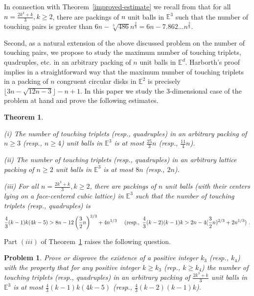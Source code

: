 \documentclass[10pt]{article}
\newtheorem{Theorem}{Theorem}
\newtheorem{Problem}{Problem}
\numberwithin{Subcase}{Case}
\begin{document}
In connection with Theorem~\ref{improved-estimate} we recall from \cite{B12} that for all $n=\frac{2k^{3} +k}{3}, k \geq 2$, there are packings of $n$ unit balls in $\mathbb{E}^3$ such that the number of touching pairs is greater than $6n-\sqrt[3]{486}n^{\frac{2}{3}}=6n-7.862\dots n^{\frac{2}{3}}$.

Second,  as a natural extension of the above discussed problem on the number of touching pairs, we propose to study the maximum number of touching triplets, quadruples, etc. in an arbitrary packing of $n$ unit balls in $\mathbb{E}^{d}$. Harborth's proof \cite{Ha} implies in a straightforward way that the maximum number of touching triplets in a packing of $n$ congruent circular disks in $\mathbb{E}^{2}$ is precisely $\lfloor 3n-\sqrt{12n-3}\rfloor-n+1$. In this paper we study the $3$-dimensional case of the problem at hand and prove the following estimates.


\begin{Theorem}\label{main-theorem}
\item (i)
The number of touching triplets (resp., quadruples) in an arbitrary packing of $n\ge 3$ (resp., $n\ge 4$) unit balls in $\mathbb{E}^3$ is at most $\frac{25}{3}n$ (resp., $\frac{11}{4}n$).
\item(ii)
The number of touching  triplets (resp., quadruples) in an arbitrary lattice packing of $n\ge 2$ unit balls in $\mathbb{E}^{3}$ is at most $8n$ (resp., $2n$).
\item (iii)
For all $n=\frac{2k^{3} +k}{3}, k \geq 2$, there are packings of $n$ unit balls (with their centers lying on a face-centered cubic lattice) in $\mathbb{E}^3$ such that the number of touching triplets (resp., quadruples) is 
$$\frac{4}{3}(k-1)k(4k-5)>8n - 12\left(\frac{3}{2}n\right)^{2/3}+4n^{1/3}\ \ \ \ ({\rm resp}.,\ \frac{4}{3}(k-2)(k-1)k>2n-4(\frac{3}{2}n)^{2/3} + 2n^{1/3})\ .$$
\end{Theorem}

Part $(iii)$ of Theorem~\ref{main-theorem} raises the following question.

\begin{Problem}
Prove or disprove the existence of a positive integer $k_3$ (resp., $k_4$) with the property that for any positive integer $k\ge k_3$ (rep., $k\ge k_4$) the number of touching triplets (resp., quadruples) in an arbitrary packing of $\frac{2k^3+k}{3}$ unit balls in $\mathbb{E}^3$ is at most $\frac{4}{3}(k-1)k(4k-5)$ (resp., $\frac{4}{3}(k-2)(k-1)k $).
\end{Problem}
\end{document}
